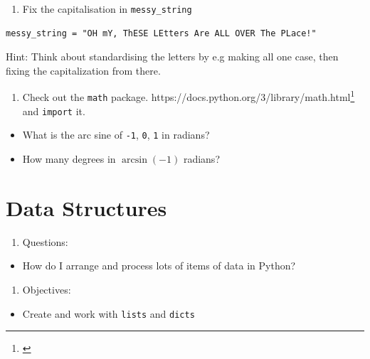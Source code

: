 \documentclass[]{book}
\providecommand{\tightlist}{%
  \setlength{\itemsep}{0pt}\setlength{\parskip}{0pt}}
\let\rmarkdownfootnote\footnote%
\def\footnote{\protect\rmarkdownfootnote}
\renewcommand{\href}[2]{#2\footnote{\url{#1}}}
\theoremstyle{definition}
\theoremstyle{definition}
\theoremstyle{definition}
\theoremstyle{remark}
\begin{document}
\begin{enumerate}
\def\labelenumi{\arabic{enumi}.}
\setcounter{enumi}{3}
\tightlist
\item
  Fix the capitalisation in \texttt{messy\_string}
\end{enumerate}

\begin{verbatim}
messy_string = "OH mY, ThESE LEtters Are ALL OVER The PLace!"
\end{verbatim}

Hint: Think about standardising the letters by e.g making all one case,
then fixing the capitalization from there.

\begin{enumerate}
\def\labelenumi{\arabic{enumi}.}
\setcounter{enumi}{4}
\tightlist
\item
  Check out the \texttt{math} package.
  \href{}{https://docs.python.org/3/library/math.html} and
  \texttt{import} it.
\end{enumerate}

\begin{itemize}
\tightlist
\item
  What is the arc sine of \texttt{-1}, \texttt{0}, \texttt{1} in
  radians?
\item
  How many degrees in \(\arcsin(-1)\) radians?
\end{itemize}

\hypertarget{data-structures}{%
\chapter{Data Structures}\label{data-structures}}

\begin{enumerate}
\def\labelenumi{\arabic{enumi}.}
\tightlist
\item
  Questions:
\end{enumerate}

\begin{itemize}
\tightlist
\item
  How do I arrange and process lots of items of data in Python?
\end{itemize}

\begin{enumerate}
\def\labelenumi{\arabic{enumi}.}
\setcounter{enumi}{1}
\tightlist
\item
  Objectives:
\end{enumerate}

\begin{itemize}
\tightlist
\item
  Create and work with \texttt{lists} and \texttt{dicts}
\end{itemize}
\end{document}
